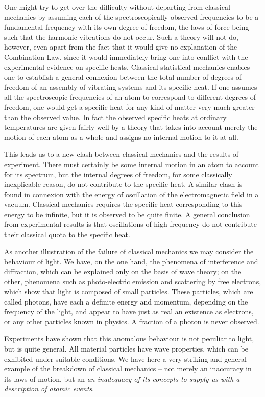 One might try to get over the difficulty without departing from classical mechanics by assuming each of the spectroscopically observed frequencies to be a fundamental frequency with its own degree of freedom, the laws of force being such that the harmonic vibrations do not occur.  Such a theory will not do, however, even apart from the fact that it would give no explanation of the Combination Law, since it would immediately bring one into conflict with the experimental evidence on specific heats.  Classical statistical mechanics enables one to establish a general connexion between the total number of degrees of freedom of an assembly of vibrating systems and its specific heat. If one assumes all the spectroscopic frequencies of an atom to correspond to different degrees of freedom, one would get a specific heat for any kind of matter very much greater than the observed value.  In fact the observed specific heats at ordinary temperatures are given fairly well by a theory that takes into account merely the motion of each atom as a whole and assigns no internal motion to it at all.

This leads us to a new clash between classical mechanics and the results of experiment.  There must certainly be some internal motion in an atom to account for its spectrum, but the internal degrees of freedom, for some classically inexplicable reason, do not contribute to the specific heat.  A similar clash is found in connexion with the energy of oscillation of the electromagnetic field in a vacuum.  Classical mechanics requires the specific heat corresponding to this energy to be infinite, but it is observed to be quite finite.  A general conclusion from experimental results is that oscillations of high frequency do not contribute their classical quota to the specific heat.

As another illustration of the failure of classical mechanics we may consider the behaviour of light.  We have, on the one hand, the phenomena of interference and diffraction, which can be explained only on the basis of wave theory; on the other, phenomena such as photo-electric emission and scattering by free electrons, which show that light is composed of small particles.  These particles, which are called photons, have each a definite energy and momentum, depending on the frequency of the light, and appear to have just as real an existence as electrons, or any other particles known in physics.  A fraction of a photon is never observed.

Experiments have shown that this anomalous behaviour is not peculiar to light, but is quite general.  All material particles have wave properties, which can be exhibited under suitable conditions.  We have here a very striking and general example of the breakdown of classical mechanics -- not merely an inaccuracy in its laws of motion, but an \emph{an inadequacy of its concepts to supply us with a description of atomic events}.

